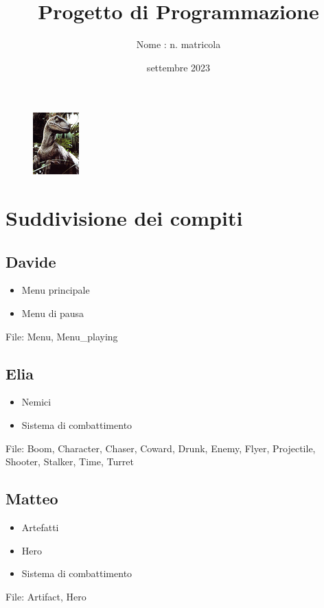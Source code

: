 \documentclass[12pt]{article}
\title{Progetto di Programmazione}
\author{Nome : n. matricola}
\date{settembre 2023}
\begin{document}
\maketitle

\begin{figure}[h]
    \centering
    \includegraphics{raptor.jpg}
\end{figure}

\newpage


\section*{Suddivisione dei compiti}
\subsection*{Davide}
\begin{itemize}
    \item Menu principale
    \item Menu di pausa
\end{itemize}
File: Menu, Menu\_playing
 
\subsection*{Elia}
\begin{itemize}
    \item Nemici 
    \item Sistema di combattimento
\end{itemize}
File: Boom, Character, Chaser, Coward, Drunk, Enemy, Flyer, Projectile, Shooter, Stalker, Time, Turret

\subsection*{Matteo}
\begin{itemize}
    \item Artefatti
    \item Hero
    \item Sistema di combattimento
\end{itemize}
File: Artifact, Hero
\end{document}
